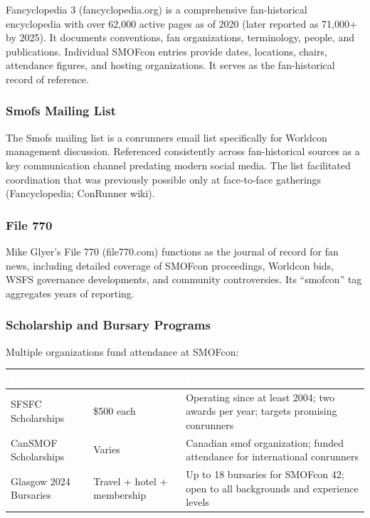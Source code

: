 \documentclass[11pt,letterpaper]{article}
\newcommand{\tableheader}[1]{\textbf{\sffamily\textcolor{white}{#1}}}
\begin{document}
Fancyclopedia 3 (fancyclopedia.org) is a comprehensive fan-historical encyclopedia with over 62,000 active pages as of 2020 (later reported as 71,000+ by 2025). It documents conventions, fan organizations, terminology, people, and publications. Individual SMOFcon entries provide dates, locations, chairs, attendance figures, and hosting organizations. It serves as the fan-historical record of reference.

\subsubsection{Smofs Mailing List}

The Smofs mailing list is a conrunners email list specifically for Worldcon management discussion. Referenced consistently across fan-historical sources as a key communication channel predating modern social media. The list facilitated coordination that was previously possible only at face-to-face gatherings (Fancyclopedia; ConRunner wiki).

\subsubsection{File 770}

Mike Glyer's File 770 (file770.com) functions as the journal of record for fan news, including detailed coverage of SMOFcon proceedings, Worldcon bids, WSFS governance developments, and community controversies. Its ``smofcon'' tag aggregates years of reporting.

\subsubsection{Scholarship and Bursary Programs}

Multiple organizations fund attendance at SMOFcon:

\begin{center}
\begin{tabularx}{\textwidth}{L{2.5cm}L{2cm}X}
\toprule
{}
\tableheader{Program} & \tableheader{Amount} & \tableheader{Details} \\
\midrule
SFSFC Scholarships & \$500 each & Operating since at least 2004; two awards per year; targets promising conrunners \\
CanSMOF Scholarships & Varies & Canadian smof organization; funded attendance for international conrunners \\
Glasgow 2024 Bursaries & Travel + hotel + membership & Up to 18 bursaries for SMOFcon 42; open to all backgrounds and experience levels \\
\bottomrule
\end{tabularx}
\end{center}
\end{document}

